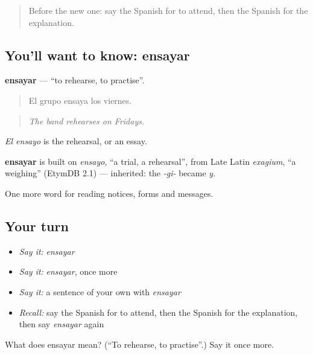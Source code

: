 \begin{quote}
Before the new one: say the Spanish for to attend, then the Spanish for the explanation.
\end{quote}

\subsection*{You'll want to know: ensayar}
\textbf{ensayar} — \textquotedblleft{}to rehearse, to practise\textquotedblright{}.

\begin{quote}
El grupo ensaya los viernes.
\end{quote}

\begin{quote}
\emph{The band rehearses on Fridays.}
\end{quote}

\emph{El ensayo} is the rehearsal, or an essay.

\begin{cousinweb}
\textbf{ensayar} is built on \emph{ensayo}, \textquotedblleft{}a trial, a rehearsal\textquotedblright{}, from Late Latin \emph{exagium}, \textquotedblleft{}a weighing\textquotedblright{} (EtymDB 2.1) — inherited: the \emph{-gi-} became \emph{y}.
\end{cousinweb}

\begin{grammarlens}[title={What you've built}]
One more word for reading notices, forms and messages.
\end{grammarlens}

\subsection*{Your turn}
\begin{itemize}
\raggedright
  \item \emph{Say it:} \emph{ensayar}
  \item \emph{Say it:} \emph{ensayar}, once more
  \item \emph{Say it:} a sentence of your own with \emph{ensayar}
  \item \emph{Recall:} say the Spanish for to attend, then the Spanish for the explanation, then say \emph{ensayar} again
\end{itemize}

\begin{tcolorbox}[breakable,colback=teal!4,colframe=teal!35!black,title={Before you move on}]
What does ensayar mean? (\textquotedblleft{}To rehearse, to practise\textquotedblright{}.) Say it once more.
\end{tcolorbox}
